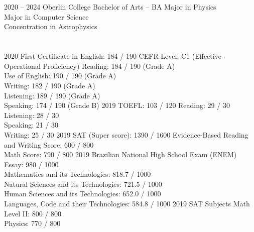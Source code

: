 \documentclass{cv}
\begin{document}
    \section*{}
        \begin{entrylist}
            \entry
                {2020 -- 2024}
                {Oberlin College}
                {Bachelor of Arts -- BA}
                {Major in Physics\\ Major in Computer Science\\ Concentration in Astrophysics}
        \end{entrylist}
    \section*{}
        \begin{entrylist}
            \entry
                {2020}
                {First Certificate in English: 184 / 190}
                {CEFR Level: C1 (Effective Operational     Proficiency)}
                {Reading: 184 / 190 (Grade A)\\ Use of English: 190 / 190 (Grade A)\\ Writing: 182 / 190 (Grade A)\\ Listening: 189 / 190 (Grade A)\\ Speaking: 174 / 190 (Grade B)}
            \entry
                {2019}
                {TOEFL: 103 / 120} 
                {}
                {Reading: 29 / 30\\ Listening: 28 / 30    \\ Speaking: 21 / 30\\ Writing: 25 / 30}
            \entry
                {2019}
                {SAT (Super score): 1390 / 1600} 
                {}
                {Evidence-Based Reading and Writing Score: 600 / 800\\ Math Score: 790 / 800}
            \entry
                {2019}
                {Brazilian National High School Exam (ENEM)}
                {}
                {Essay: 980 / 1000\\ Mathematics and its Technologies: 818.7 / 1000\\ Natural Sciences and its Technologies: 721.5 / 1000\\ Human Sciences and its Technologies: 652.0 / 1000\\ Languages, Code and their Technologies: 584.8 / 1000}
            \entry
                {2019}
                {SAT Subjects}
                {}
                {Math Level II: 800 / 800\\ Physics: 770 / 800}
        \end{entrylist}
\end{document}

